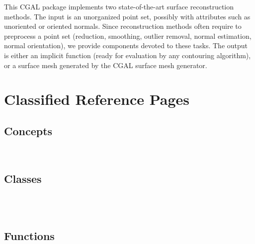 


This CGAL package implements two state-of-the-art surface reconstruction methods.
The input is an unorganized point set, possibly with attributes such as unoriented or oriented normals.
Since reconstruction methods often require to preprocess a point set (reduction, smoothing,
outlier removal, normal estimation, normal orientation), we provide components devoted to these tasks.
The output is either an implicit function (ready for evaluation by any contouring algorithm),
or a surface mesh generated by the CGAL surface mesh generator.

\section{Classified Reference Pages}


\subsection{Concepts}

  \\


\subsection{Classes}

  \\
  \\


\subsection{Functions}

  \\


